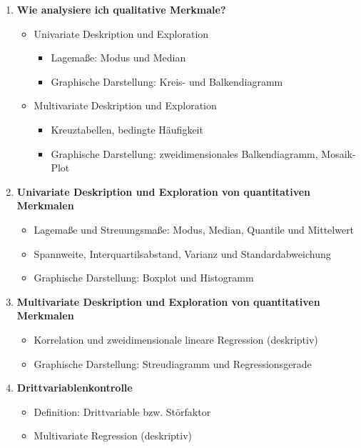 \documentclass[a4paper,fontsize=12pt]{scrartcl}
\begin{document}
\begin{enumerate}
  \item{ \textbf{Wie analysiere ich qualitative Merkmale?}
    \begin{itemize}
     \item{Univariate Deskription und Exploration 
      \begin{itemize}
        \item{Lagemaße: Modus und Median}
        \item{Graphische Darstellung: Kreis- und Balkendiagramm}
      \end{itemize}
     } %
     \item{Multivariate Deskription und Exploration} %
     \begin{itemize}
        \item{Kreuztabellen, bedingte Häufigkeit} %
        \item{Graphische Darstellung: zweidimensionales Balkendiagramm,  Mosaik-Plot}
      \end{itemize}
    \end{itemize}
  }
    \item{\textbf{Univariate Deskription und Exploration von  quantitativen Merkmalen}
    \begin{itemize}
     \item{Lagemaße und Streuungsmaße: Modus, Median, Quantile und Mittelwert} %
        \item{Spannweite, Interquartilsabstand, Varianz und Standardabweichung}
        \item{Graphische Darstellung: Boxplot und Histogramm}
 \end{itemize}
  }
  
     \item{\textbf{Multivariate Deskription und Exploration von  quantitativen Merkmalen}
    \begin{itemize}
    
         \item{Korrelation und zweidimensionale lineare Regression (deskriptiv)} %
         \item{Graphische Darstellung: Streudiagramm und Regressionsgerade}
    \end{itemize}
  }
  \item{\textbf{Drittvariablenkontrolle}
    \begin{itemize}
      \item{Definition: Drittvariable bzw. Störfaktor}
      \item{Multivariate Regression (deskriptiv)}
    \end{itemize}
  }
  

\end{enumerate}
\end{document}
